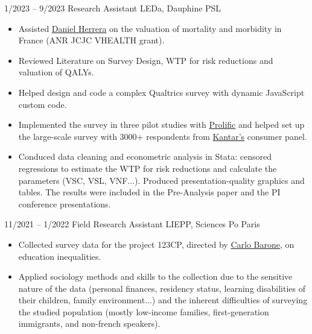 \documentclass[9pt]{developercv} %
\begin{document}
\vspace{-10 pt}
\begin{entrylist}
	\entry
        {1/2023 -- 9/2023}
		{Research Assistant}
		{LEDa, Dauphine PSL}
		{\vspace{-10pt}
        \begin{itemize}[noitemsep,topsep=0pt,parsep=0pt,partopsep=0pt, leftmargin=-1pt]
            \item Assisted \href{https://sites.google.com/view/daniel-herrera-araujo/home}{Daniel Herrera} on the valuation of mortality and morbidity in France (ANR JCJC VHEALTH grant).
            \item Reviewed Literature on Survey Design, WTP for risk reductions and valuation of QALYs. 
            \item Helped design and code a complex Qualtrics survey with dynamic JavaScript custom code.
            \item Implemented the survey in three pilot studies with \href{https://www.prolific.com/}{Prolific} and helped set up the large-scale survey with 3000+ respondents from \href{https://www.kantar.com}{Kantar's} consumer panel. 
            \item Conduced data cleaning and econometric analysis in Stata: censored regressions to estimate the WTP for risk reductions and calculate the parameters (VSC, VSL, VNF...). Produced presentation-quality graphics and tables. The results were included in the Pre-Analysis paper and the PI conference presentations. 
        \end{itemize} 
        }
	\entry
		{11/2021 -- 1/2022}
		{Field Research Assistant}
		{LIEPP, Sciences Po Paris}
		{\vspace{-10pt}
        \begin{itemize}[noitemsep,topsep=0pt,parsep=0pt,partopsep=0pt, leftmargin=-1pt]
            \item Collected survey data for the project 123CP, directed by \href{https://www.sciencespo.fr/liepp/en/users/carlobarone.html}{Carlo Barone}, on education inequalities. 
            \item Applied sociology methods and skills to the collection due to the sensitive nature of the data (personal finances, residency status, learning disabilities of their children, family environment...) and the inherent difficulties of surveying the studied population (mostly low-income families, first-generation immigrants, and non-french speakers).

\end{itemize}}
\end{entrylist}
\end{document}
